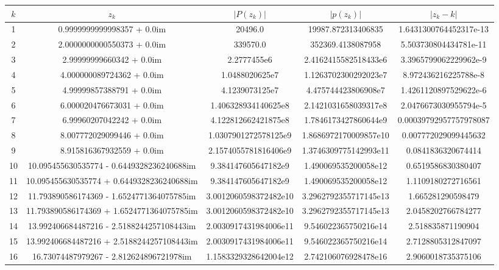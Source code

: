 \documentclass[10pt]{article}
\begin{document}
\begin{adjustbox}{center}

    \begin{tabular}{|c| c c c c|}
        \hline
        $k$ & $z_k$ & $|P(z_k)|$ & $|p(z_k)|$ & $|z_k - k|$\\
        \hline\hline
        1 & 0.9999999999998357 + 0.0im & 20496.0 & 19987.872313406835 & 1.6431300764452317e-13\\
        2 & 2.0000000000550373 + 0.0im & 339570.0 & 352369.4138087958 & 5.503730804434781e-11\\
        3 & 2.99999999660342 + 0.0im & 2.2777455e6 & 2.4162415582518433e6 & 3.3965799062229962e-9\\
        4 & 4.000000089724362 + 0.0im & 1.0488020625e7 & 1.1263702300292023e7 & 8.972436216225788e-8\\
        5 & 4.99999857388791 + 0.0im & 4.1239073125e7 & 4.475744423806908e7 & 1.4261120897529622e-6\\
        6 & 6.000020476673031 + 0.0im & 1.406328934140625e8 & 2.1421031658039317e8 & 2.0476673030955794e-5\\
        7 & 6.99960207042242 + 0.0im & 4.122812662421875e8 & 1.7846173427860644e9 & 0.00039792957757978087\\
        8 & 8.007772029099446 + 0.0im & 1.0307901272578125e9 & 1.8686972170009857e10 & 0.007772029099445632\\
        9 & 8.915816367932559 + 0.0im & 2.1574055781816406e9 & 1.3746309775142993e11 & 0.0841836320674414\\
        10 & 10.095455630535774 - 0.6449328236240688im & 9.384147605647182e9 & 1.490069535200058e12 & 0.6519586830380407\\
        11 & 10.095455630535774 + 0.6449328236240688im & 9.384147605647182e9 & 1.490069535200058e12 & 1.1109180272716561\\
        12 & 11.793890586174369 - 1.6524771364075785im & 3.0012060598372482e10 & 3.2962792355717145e13 & 1.665281290598479\\
        13 & 11.793890586174369 + 1.6524771364075785im & 3.0012060598372482e10 & 3.2962792355717145e13 & 2.0458202766784277\\
        14 & 13.992406684487216 - 2.5188244257108443im & 2.0030917431984006e11 & 9.546022365750216e14 & 2.518835871190904\\
        15 & 13.992406684487216 + 2.5188244257108443im & 2.0030917431984006e11 & 9.546022365750216e14 & 2.7128805312847097\\
        16 & 16.73074487979267 - 2.812624896721978im & 1.1583329328642004e12 & 2.742106076928478e16 & 2.9060018735375106\\

\end{tabular}
\end{adjustbox}
\end{document}
